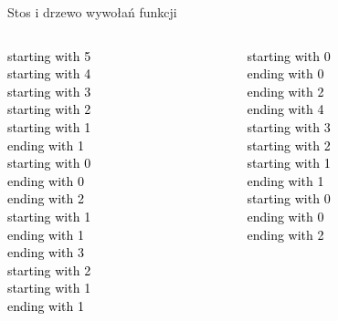 \begin{frame}{Stos i drzewo wywołań funkcji}
    \centering
    \begin{columns}
        \begin{column}{0.25\textwidth}
            \textcolor{black}{starting with 5}\\
            \textcolor{black}{starting with 4}\\
            \textcolor{black}{starting with 3}\\
            \textcolor{black}{starting with 2}\\
            \textcolor{black}{starting with 1}\\
            \textcolor{black}{ending with 1}\\
            \textcolor{black}{starting with 0}\\
            \textcolor{black}{ending with 0}\\
            \textcolor{black}{ending with 2}\\
            \textcolor{black}{starting with 1}\\
            \textcolor{black}{ending with 1}\\
            \textcolor{black}{ending with 3}\\
            \textcolor{black}{starting with 2}\\
            \textcolor{black}{starting with 1}\\
            \textcolor{black}{ending with 1}\\
        \end{column}
        \begin{column}{0.25\textwidth}
            \textcolor{black}{starting with 0}\\
            \textcolor{black}{ending with 0}\\
            \textcolor{black}{ending with 2}\\
            \textcolor{black}{ending with 4}\\
            \textcolor{black}{starting with 3}\\
            \textcolor{black}{starting with 2}\\
            \textcolor{black}{starting with 1}\\
            \textcolor{black}{ending with 1}\\
            \textcolor{black}{starting with 0}\\
            \textcolor{black}{ending with 0}\\
            \textcolor{black}{ending with 2}\\

\end{column}
\end{columns}
\end{frame}
